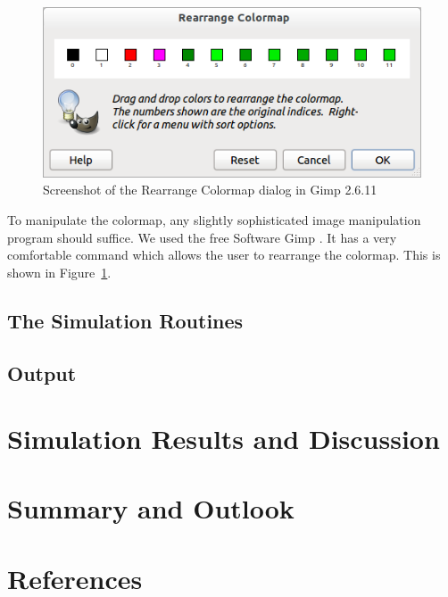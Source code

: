 \documentclass[11pt]{article}
\begin{document}
\begin{figure}[h]
	\centering
	\includegraphics[scale=0.5]{images/gimp.png}
	\caption{Screenshot of the Rearrange Colormap dialog in Gimp 2.6.11}
	\label{gimpscreenshot}
	
\end{figure}
To manipulate the colormap, any slightly sophisticated image manipulation program should suffice. We used the free Software Gimp \cite{gimp}. It has a very comfortable command which allows the user to rearrange the colormap. This is shown in Figure~\ref{gimpscreenshot}.

\subsection{The Simulation Routines} %
\label{sub:The simulation Routines}


\subsection{Output} %
\label{sub:Output}

\section{Simulation Results and Discussion}

\section{Summary and Outlook}

\section{References}

\end{document}
